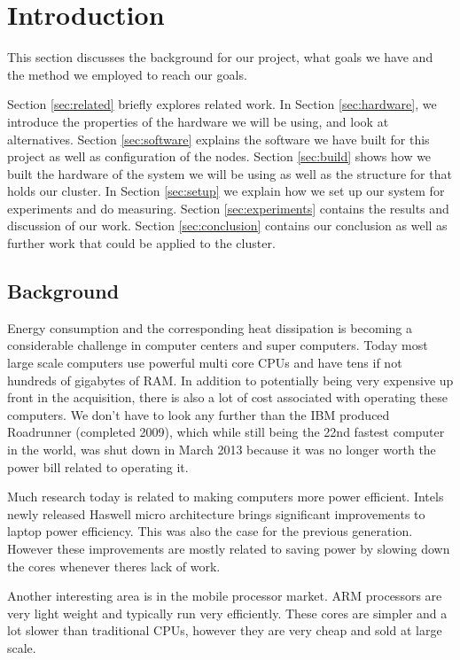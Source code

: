 \clearpage
\section{Introduction}
\label{sec:introduction}

This section discusses the background for our project, what goals we have and the method we employed to reach our goals.

Section \ref{sec:related} briefly explores related work.
In Section \ref{sec:hardware}, we introduce the properties of the hardware we will be using, and look at alternatives.
Section \ref{sec:software} explains the software we have built for this project as well as configuration of the nodes.
Section \ref{sec:build} shows how we built the hardware of the system we will be using as well as the structure for that holds our cluster.
In Section \ref{sec:setup} we explain how we set up our system for experiments and do measuring.
Section \ref{sec:experiments} contains the results and discussion of our work.
Section \ref{sec:conclusion} contains our conclusion as well as further work that could be applied to the cluster.

\subsection{Background}
Energy consumption and the corresponding heat dissipation is becoming a considerable challenge in computer centers and super computers. Today most large scale computers use powerful multi core CPUs and have tens if not hundreds of gigabytes of RAM. In addition to potentially being very expensive up front in the acquisition, there is also a lot of cost associated with operating these computers. We don't have to look any further than the IBM produced Roadrunner (completed 2009), which while still being the 22nd fastest computer in the world, was shut down in March 2013 because it was no longer worth the power bill related to operating it.\cite{roadrunner}

Much research today is related to making computers more power efficient. Intels newly released Haswell micro architecture brings significant improvements to laptop power efficiency. This was also the case for the previous generation. However these improvements are mostly related to saving power by slowing down the cores whenever theres lack of work.

Another interesting area is in the mobile processor market. ARM processors are very light weight and typically run very efficiently. These cores are simpler and a lot slower than traditional CPUs, however they are very cheap and sold at large scale. 

